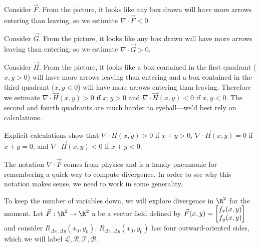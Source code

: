 \begin{example}
\begin{center}
	\end{center}

	Consider $\vec F$.  From the picture, it looks like any box drawn will have
	more arrows entering than leaving, so we estimate $\nabla \cdot \vec F < 0$.

	Consider $\vec G$.  From the picture, it looks like any box drawn will have more arrows
	leaving than entering, so we estimate $\nabla \cdot \vec G > 0$.

	Consider $\vec H$.  From the picture, it looks like a box contained
	in the first quadrant ($x,y>0$) will have more arrows leaving than entering and
	a box contained in the third quadrant ($x,y<0$) will have more arrows entering than
	leaving.  Therefore we estimate $\nabla \cdot \vec H(x,y)>0$ if $x,y>0$ and $\nabla \cdot \vec H(x,y)<0$
	if $x,y<0$.  The second and fourth quadrants are much harder to eyeball---we'd best rely on calculations.

	Explicit calculations show that $\nabla \cdot \vec H(x,y)>0$ if $x+y>0$, $\nabla \cdot \vec H(x,y)=0$ if $x+y=0$,
	and $\nabla \cdot \vec H(x,y)<0$ if $x+y<0$.
\end{example}

The notation $\nabla \cdot \vec F$ comes from physics and is a handy pneumonic
for remembering a quick way to compute divergence.  In order to see why this notation
makes sense, we need to work in some generality.

\bigskip
To keep the number of variables down, we will explore divergence in $\R^2$ for the moment.
Let $\vec F:\R^2\to\R^2$ a be a vector field defined by
$\vec F(x,y)=\mat{f_x(x,y)\\f_y(x,y)}$ and consider $R_{\Delta x,\Delta y}(x_0,y_0)$.
$R_{\Delta x,\Delta y}(x_0,y_0)$ has four outward-oriented sides, which we will label $\mathcal L,\mathcal R,\mathcal T,\mathcal B$.

